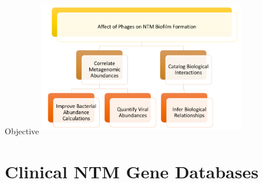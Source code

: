 \documentclass[11pt]{beamer}
\begin{document}
	\begin{frame}{Objective}
	\center
	\includegraphics[height=6cm, width=9cm]{objective.png}
	
	\end{frame}

	
\section{Clinical NTM Gene Databases}
\end{document}
